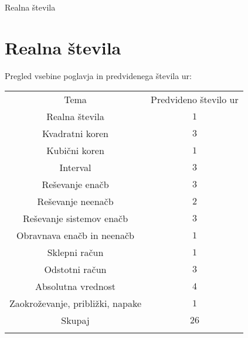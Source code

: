\begin{priprava}{0}{}{}{Realna števila}{}{}
    
    \chapter{Realna števila}

    \Large{Pregled vsebine poglavja in predvidenega števila ur:}

    \begin{table}[H]
        \centering
        \begin{tabular}{||c|c||} 
        \hhline{|t:==:t|}
        \rowcolor[rgb]{0.843,0.718,0.718} 
        Tema  & Predvideno število ur   \\ 
        \hhline{|:==:|}
        Realna števila & $1$    \\ 
        \hline
        Kvadratni koren & $3$    \\ 
        \hline
        Kubični koren & $1$    \\ 
        \hline
        Interval & $3$     \\
        \hline
        Reševanje enačb & $3$     \\
        \hline
        Reševanje neenačb & $2$    \\ 
        \hline
        Reševanje sistemov enačb & $3$    \\ 
        \hline
        Obravnava enačb in neenačb & $1$     \\
        \hline
        Sklepni račun & $1$     \\
        \hline
        Odstotni račun & $3$    \\ 
        \hline
        Absolutna vrednost & $4$    \\ 
        \hline
        Zaokroževanje, približki, napake & $1$     \\
        \hhline{|:==:|}
        Skupaj & $26$     \\
        \hhline{|b:==:b|}
        \end{tabular}
    \end{table}


    
\end{priprava}